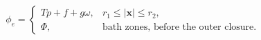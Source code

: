 $$
\phi_e = \begin{cases}
T p + f + g \omega, & r_1\le\lvert\mathbf x\rvert\le r_2,\\
\Phi, & \text{bath zones, before the outer closure}.
\end{cases}
$$

